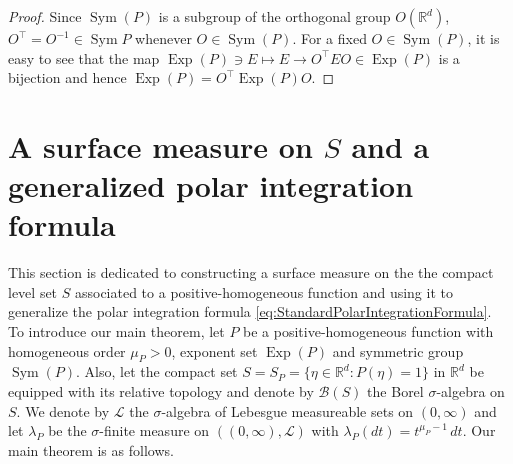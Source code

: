\documentclass[11pt]{article}
\newcommand\OdR{\mbox{O}_d(\mathbb{R})} %
\newcommand\Sym{\operatorname{Sym}}
\newcommand\Exp{\operatorname{Exp}}
\begin{document}
\begin{proof}
Since $\Sym(P)$ is a subgroup of the orthogonal group $O(\mathbb{R}^d)$, $O^\top = O^{-1} \in \Sym{P}$ whenever $O\in\Sym(P)$. For a fixed $O\in\Sym(P)$, it is easy to see that the map $\Exp(P)\ni E\mapsto E\to O^\top E O\in\Exp(P)$ is a bijection and hence $\Exp(P)=O^\top \Exp(P) O$. 
\begin{comment}
Observe that, if $O^\top E_1 O=O^\top E_2 O$, then by left multiplying by $O$ and right multiplying by $O^T=O^{-1}$ we find that $E_1=E_2$ whence $\mbox{Conj}$ is injective.
Now, if $E_i, E_j\in \Exp(P)$ and $E_i\neq E_j$, then $O^\top E_i O \neq O^\top E_j O$ since $O,O^\top\in \OdR{}$. Thus the conjugation map induced by $O$, $\varphi_O: \Exp{P}\to \Exp{P}$ defined by 
\begin{equation*}
    \varphi_O (E) = O^\top E O
\end{equation*}
is one-to-one. Further, for any $E\in \Exp(P)$, a similar argument as \eqref{eq:OOO} shows that $OEO^\top \in \Exp(P)$ and satisfies
\begin{equation*}
    \varphi_O(OEO^\top) = O^\top (OEO^\top) O = E\in \Exp{(P)}.
\end{equation*}
So, $\varphi_O$ is bijective, which means 
\begin{equation*}
    \Exp(P) = O^\top \Exp(P) O = O \Exp{(P)} O^\top, \quad \text{for all } O\in \Sym{(P)}.
\end{equation*}
\end{comment}
\end{proof}






\section{A surface measure on $S$ and a generalized polar integration formula}\label{sec:IntegrationFormula}

This section is dedicated to constructing a surface measure on the the compact level set $S$ associated to a positive-homogeneous function and using it to generalize the polar integration formula \eqref{eq:StandardPolarIntegrationFormula}. To introduce our main theorem, let $P$ be a positive-homogeneous function with homogeneous order $\mu_P>0$, exponent set $\Exp(P)$ and symmetric group $\Sym(P)$. Also, let the compact set $S=S_P=\{\eta\in\mathbb{R}^d:P(\eta)=1\}$ in $\mathbb{R}^d$ be equipped with its relative topology and denote by $\mathcal{B}(S)$ the Borel $\sigma$-algebra on $S$. We denote by $\mathcal{L}$ the $\sigma$-algebra of Lebesgue measureable sets on $(0,\infty)$ and let $\lambda_P$ be the $\sigma$-finite measure on $((0,\infty),\mathcal{L})$ with $\lambda_P(dt)=t^{\mu_P-1}\,dt$. Our main theorem is as follows. 
\end{document}
